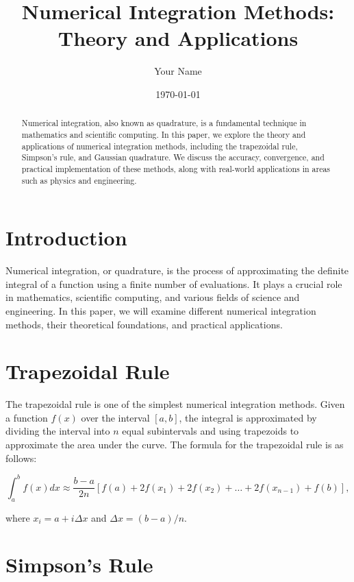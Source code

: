 \title{Numerical Integration Methods: Theory and Applications}
\author{Your Name}
\date{\today}


\maketitle

\begin{abstract}
Numerical integration, also known as quadrature, is a fundamental technique in mathematics and scientific computing. In this paper, we explore the theory and applications of numerical integration methods, including the trapezoidal rule, Simpson's rule, and Gaussian quadrature. We discuss the accuracy, convergence, and practical implementation of these methods, along with real-world applications in areas such as physics and engineering.
\end{abstract}

\section{Introduction}

Numerical integration, or quadrature, is the process of approximating the definite integral of a function using a finite number of evaluations. It plays a crucial role in mathematics, scientific computing, and various fields of science and engineering. In this paper, we will examine different numerical integration methods, their theoretical foundations, and practical applications.

\section{Trapezoidal Rule}

The trapezoidal rule is one of the simplest numerical integration methods. Given a function $f(x)$ over the interval $[a, b]$, the integral is approximated by dividing the interval into $n$ equal subintervals and using trapezoids to approximate the area under the curve. The formula for the trapezoidal rule is as follows:

\begin{equation}
\int_{a}^{b} f(x) dx \approx \frac{b - a}{2n} \left[f(a) + 2f(x_1) + 2f(x_2) + \ldots + 2f(x_{n-1}) + f(b)\right],
\end{equation}

where $x_i = a + i\Delta x$ and $\Delta x = (b - a)/n$.

\section{Simpson's Rule}

